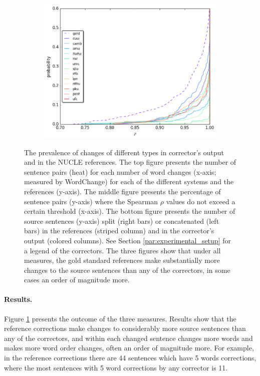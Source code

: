 \documentclass[letter,11pt]{article}
\begin{document}
\begin{figure}[tbp]
\begin{subfigure}[]{0.4\textwidth}
    \includegraphics[width = \textwidth]{spearman_ecdf}
  \end{subfigure}
  \caption{\label{fig:over-conservatism}
    The prevalence of changes of different types in corrector's output and in the NUCLE references.
    The top figure presents the number of sentence pairs (heat) for each number of word changes
    (x-axis; measured by {\sc WordChange}) for each of the different systems and the references (y-axis).
    The middle figure presents the percentage of sentence pairs (y-axis) where the
    Spearman $\rho$ values do not exceed a certain threshold (x-axis).
    The bottom figure presents the number of source sentences (y-axis) split (right bars) or concatenated
    (left bars) in the references (striped column) and in the corrector's output (colored columns).
    See Section \ref{par:experimental_setup} for a legend of the correctors.
    The three figures show that under all measures, the gold standard references make
    substantially more changes to the source sentences than any of the correctors,
    in some cases an order of magnitude more.
  }
\end{figure}


\paragraph{Results.}
Figure \ref{fig:over-conservatism} presents the outcome of the three measures. 
Results show that the reference corrections make changes to considerably more source sentences than any of the correctors, and within each changed sentence changes more words and makes more word order changes, often an order of magnitude more. For example, in the reference corrections there are 44 sentences which have 5 words corrections, where the most sentences with 5 word corrections by any corrector is 11.
\end{document}
